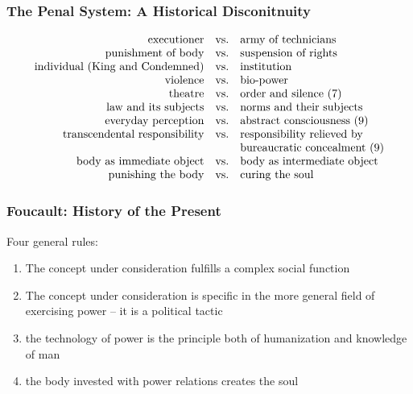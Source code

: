 \documentclass[xcolor=dvipsnames]{beamer}
\begin{document}
\begin{frame}
  \frametitle{The Penal System: A Historical Disconitnuity}
  \begin{equation}
    \label{eq:zeiqueex}
    \begin{array}{rcl}
      \mbox{executioner} & \mbox{vs.} & \mbox{army of technicians} \\
      \mbox{punishment of body} & \mbox{vs.} & \mbox{suspension of rights} \\
      \mbox{individual (King and Condemned)} & \mbox{vs.} & \mbox{institution} \\
      \mbox{violence} & \mbox{vs.} & \mbox{bio-power} \\
      \mbox{theatre} & \mbox{vs.} & \mbox{order and silence (7)} \\
      \mbox{law and its subjects} & \mbox{vs.} & \mbox{norms and their subjects} \\
      \mbox{everyday perception} & \mbox{vs.} & \mbox{abstract consciousness (9)} \\
      \mbox{transcendental responsibility} & \mbox{vs.} & \mbox{responsibility relieved by} \\
      \mbox{} & \mbox{} & \mbox{bureaucratic concealment (9)} \\
      \mbox{body as immediate object} & \mbox{vs.} & \mbox{body as intermediate object} \\
      \mbox{punishing the body} & \mbox{vs.} & \mbox{curing the soul} \\
    \end{array}\notag
  \end{equation}
\end{frame}

\begin{frame}
  \frametitle{Foucault: History of the Present}
Four general rules:
\begin{enumerate}
\item The concept under consideration fulfills a \alert{complex
    social function}
\item The concept under consideration is specific in the more
  general field of exercising power -- it is a \alert{political
    tactic}
\item the \alert{technology of power} is the principle both of
  humanization and knowledge of man
\item the body invested with power relations \alert{creates the soul}
\end{enumerate}
\end{frame}
\end{document}
